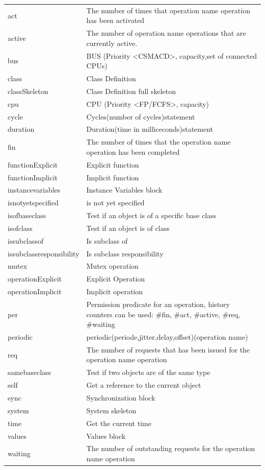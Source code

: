 \documentclass{overturerepchap}
\begin{document}
\begin{longtable}{| l| p{9cm}| }
act                       & The number of times that operation name operation has been activated\\
active                    & The number of operation name operations that are currently active.\\
bus                       & BUS (Priority <CSMACD>, capacity,set of connected CPUs)\\
class                     & Class Definition\\
classSkeleton             & Class Definition full skeleton\\
cpu                       & CPU (Priority <FP/FCFS>, capacity)\\
cycle                     & Cycles(number of cycles)statement\\
duration                  & Duration(time in milliceconds)statement\\
fin                       & The number of times that the operation name operation has been completed\\
functionExplicit          & Explicit function\\
functionImplicit          & Implicit function\\
instancevariables         & Instance Variables block\\
isnotyetspecified         & is not yet specified\\
isofbaseclass             & Test if an object is of a specific base class\\
isofclass                 & Test if an object is of class\\
issubclassof              & Is subclass of\\
issubclassresponsibility  & Is subclass responsibility\\
mutex                     & Mutex operation\\
operationExplicit         & Explicit Operation\\
operationImplicit         & Implicit operation\\
per                       & Permission predicate for an operation, history counters can be used: \#fin, \#act, \#active, \#req, \#waiting\\
periodic                  & periodic(periode,jitter,delay,offset)(operation name)\\
req                       & The number of requests that has been issued for the operation name operation\\
samebaseclass             & Test if two objects are of the same type\\
self                      & Get a reference to the current object\\
sync                      & Synchronization block\\
system                    & System skeleton\\
time                      & Get the current time\\
values                    & Values block\\
waiting                   & The number of outstanding requests for the operation name operation\\\hline
\end{longtable}
\end{document}
